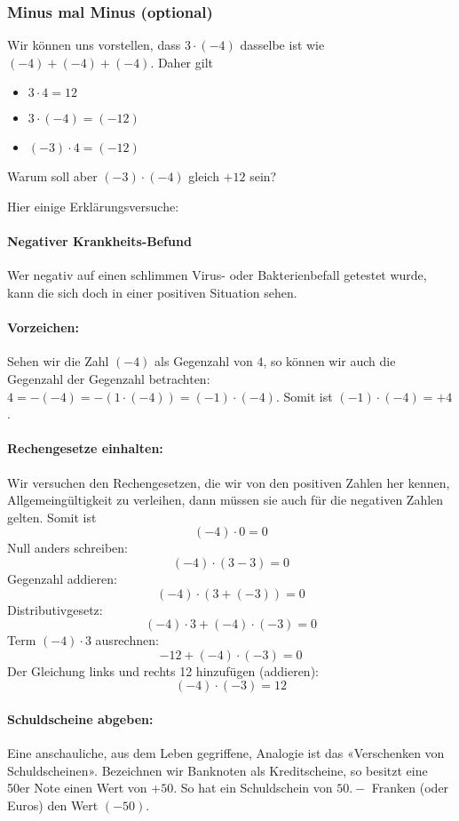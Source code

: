 \newpage
\subsubsection{Minus mal Minus (optional)}
Wir können uns vorstellen, dass $3 \cdot (-4)$ dasselbe ist wie $(-4) + (-4) + (-4)$. Daher gilt
\begin{itemize}
\item $3 \cdot 4 = 12$
\item $3 \cdot (-4) = (-12)$
\item $(-3) \cdot 4 = (-12)$
\end{itemize}
Warum soll aber $(-3)\cdot(-4)$ gleich $+12$ sein?

Hier einige Erklärungsversuche:


\paragraph{Negativer Krankheits-Befund}
Wer negativ auf einen schlimmen Virus- oder Bakterienbefall getestet wurde, kann
die sich doch in einer positiven Situation sehen.

\paragraph{Vorzeichen:} Sehen wir die Zahl $(-4)$ als Gegenzahl von $4$, so können wir auch die Gegenzahl der Gegenzahl betrachten:
$4 = -(-4) = -(1\cdot(-4)) = (-1)\cdot(-4)$. Somit ist $(-1)\cdot(-4) = +4$.

\paragraph{Rechengesetze einhalten:} Wir versuchen den Rechengesetzen, die wir von den positiven Zahlen her kennen, Allgemeingültigkeit zu verleihen, dann müssen sie auch für die negativen Zahlen gelten.
Somit ist
$$(-4)          \cdot 0 = 0$$
Null anders schreiben:
$$(-4)    \cdot (3-3) = 0$$
Gegenzahl addieren:
$$(-4)\cdot(3 + (-3)) = 0$$
Distributivgesetz:
$$(-4)\cdot3 + (-4)\cdot (-3) = 0$$
Term $(-4)\cdot3$ ausrechnen:
$$-12 + (-4)\cdot (-3)= 0$$
Der Gleichung links und rechts 12 hinzufügen (addieren):
$$(-4)\cdot (-3) = 12$$
\newpage

\paragraph{Schuldscheine abgeben:}
Eine anschauliche, aus dem Leben gegriffene, Analogie ist das «Verschenken von Schuldscheinen». Bezeichnen wir Banknoten als Kreditscheine, so besitzt eine 50er Note einen Wert von $+50$. So hat ein Schuldschein von $50.-$ Franken (oder Euros) den Wert $(-50)$.

